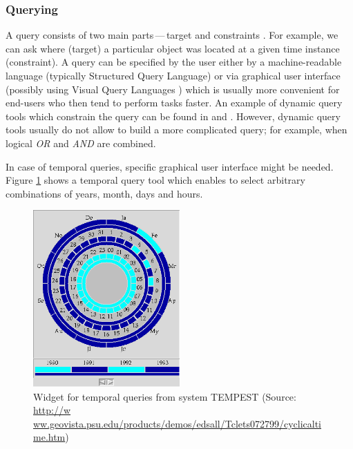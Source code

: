 \documentclass[a4paper,12pt]{book}
\begin{document}
\subsubsection{Querying}
A query consists of two main parts\,---\,target and constraints \cite{andrienko2003exploratory}.
For example, we can ask where (target) a particular object was located at a given time instance (constraint).
A query can be specified by the user either by a machine-readable language (typically Structured Query Language)
or via graphical user interface (possibly using Visual Query Languages \cite{catarci1997visual})
which is usually more convenient for end-users who then tend to perform tasks faster.
An example of dynamic query tools which constrain the query can be found
in \cite{ahlberg1992dynamic} and \cite{hochheiser2004dynamic}.
However, dynamic query tools usually do not allow to build a more complicated query;
for example, when logical \emph{OR} and \emph{AND} are combined.


In case of temporal queries, specific graphical user interface
might be needed. Figure \ref{fig:cyclical_time} shows a temporal query tool
which enables to select arbitrary combinations of years, month, days and hours.


\begin{figure}[h!]
  \centering
  \includegraphics[width=0.5\textwidth]{./images/cyclical_time.png}
  \caption{Widget for temporal queries from system TEMPEST (Source:
      \url{http://w ww.geovista.psu.edu/products/demos/edsall/Tclets072799/cyclicaltime.htm})}
  \label{fig:cyclical_time}
\end{figure}
\end{document}
